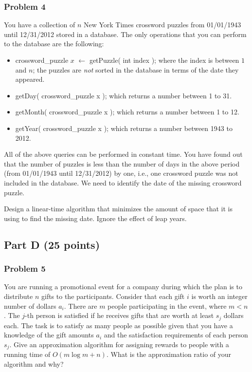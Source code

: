 \documentclass[11pt]{article}
\begin{document}
\subsubsection*{Problem 4} 

You have a collection of $n$ New York Times
crossword puzzles from 01/01/1943 until 12/31/2012 stored in a
database. The only operations that you can perform to the database are
the following:
\begin{itemize}
\item crossword\_puzzle $x$ $\leftarrow$ getPuzzle( int index ); where the
  index is between $1$ and $n$; the puzzles are \emph{not} sorted in the
  database in terms of the date they appeared.
\item getDay( crossword\_puzzle x ); which returns a number between 1
  to 31.
\item getMonth( crossword\_puzzle x ); which returns a number between
  1 to 12.
\item getYear( crossword\_puzzle x ); which returns a number between
  1943 to 2012.
\end{itemize}
All of the above queries can be performed in constant time. You have
found out that the number of puzzles is less than the number of days
in the above period (from 01/01/1943 until 12/31/2012) by one, i.e.,
one crossword puzzle was not included in the database. We need to
identify the date of the missing crossword puzzle.

Design a linear-time algorithm that minimizes the amount of space that
it is using to find the missing date. Ignore the effect of leap years.

\subsection*{Part D (25 points)}

\subsubsection*{Problem 5} 

You are running a promotional event for a
company during which the plan is to distribute $n$ gifts to the
participants. Consider that each gift $i$ is worth an integer number
of dollars $a_i$. There are $m$ people participating in the event,
where $m < n$. The $j$-th person is satisfied if he receives gifts
that are worth at least $s_j$ dollars each. The task is to satisfy as
many people as possible given that you have a knowledge of the gift
amounts $a_i$ and the satisfaction requirements of each person
$s_j$. Give an approximation algorithm for assigning rewards to people
with a running time of $O(m\log m+n)$. What is the approximation ratio
of your algorithm and why?
\end{document}
